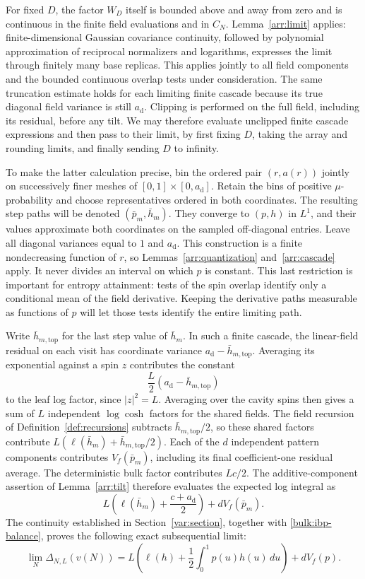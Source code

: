 For fixed $D$, the factor $W_D$ itself is bounded above and away from
zero and is continuous in the finite field evaluations and in $C_N$.
Lemma~\ref{arr:limit} applies: finite-dimensional Gaussian covariance
continuity, followed by polynomial approximation of reciprocal
normalizers and logarithms, expresses the limit through finitely many
base replicas.  This applies jointly to all field components and the
bounded continuous overlap tests under consideration.  The same
truncation estimate holds for each limiting finite cascade because its
true diagonal field variance is still $a_{\mathrm d}$.  Clipping is
performed on the full field, including its residual, before any tilt.
We may therefore evaluate unclipped finite cascade expressions and
then pass to their limit, by first fixing $D$, taking the array and
rounding limits, and finally sending $D$ to infinity.

To make the latter calculation precise, bin the ordered pair
$(r,a(r))$ jointly on successively finer meshes of
$[0,1]\times[0,a_{\mathrm d}]$.  Retain the bins of positive
$\mu$-probability and choose representatives ordered in both
coordinates.  The resulting step paths will be denoted
$(\bar p_m,\bar h_m)$.  They converge to $(p,h)$ in $L^1$, and their
values approximate both coordinates on the sampled off-diagonal
entries.  Leave all diagonal variances equal to $1$ and
$a_{\mathrm d}$.  This construction is a finite nondecreasing
function of $r$, so Lemmas~\ref{arr:quantization} and~\ref{arr:cascade}
apply.  It never divides an interval on which $p$ is constant.
This last restriction is important for entropy attainment: tests of
the spin overlap identify only a conditional mean of the field
derivative.  Keeping the derivative paths measurable as functions of
$p$ will let those tests identify the entire limiting path.

Write $\bar h_{m,\mathrm{top}}$ for the last step value of $\bar h_m$.
In such a finite cascade, the linear-field residual on each visit has
coordinate variance $a_{\mathrm d}-\bar h_{m,\mathrm{top}}$.
Averaging its exponential against a spin $z$ contributes the constant
\[
 \frac L2(a_{\mathrm d}-\bar h_{m,\mathrm{top}})
\]
to the leaf log factor, since $|z|^2=L$.  Averaging over the cavity
spins then gives a sum of $L$ independent $\log\cosh$ factors for the
shared fields.  The field recursion of Definition~\ref{def:recursions}
subtracts $\bar h_{m,\mathrm{top}}/2$, so these shared factors contribute
$L(\ell(\bar h_m)+\bar h_{m,\mathrm{top}}/2)$.
Each of the $d$ independent pattern components contributes
$V_f(\bar p_m)$, including its final coefficient-one residual average.
The deterministic bulk factor contributes $Lc/2$.
The additive-component assertion of Lemma~\ref{arr:tilt} therefore
evaluates the expected log integral as
\[
 L\left(\ell(\bar h_m)+\frac{c+a_{\mathrm d}}2\right)
        +dV_f(\bar p_m).
\]
The continuity established in Section~\ref{var:section}, together with
\eqref{bulk:ibp-balance}, proves the following exact subsequential
limit:
\begin{equation}\label{cav:increment-limit}
 \lim_N\Delta_{N,L}(v(N))
 =L\left(\ell(h)+\frac12\int_0^1p(u)h(u)\,du\right)+dV_f(p).
\end{equation}

